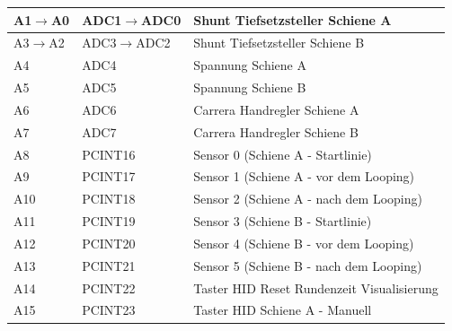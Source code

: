 \documentclass[a4paper, 11pt]{report}
\begin{document}
\begin{table}[hb]
\begin{tabular}{|l|l|l|}
			\hline
			A1$\rightarrow$A0 & ADC1$\rightarrow$ADC0 & Shunt Tiefsetzsteller Schiene A\\
			\hline
			A3$\rightarrow$A2 & ADC3$\rightarrow$ADC2 & Shunt Tiefsetzsteller Schiene B\\
			\hline
			A4 & ADC4 & Spannung Schiene A\\
			\hline
			A5 & ADC5 & Spannung Schiene B\\
			\hline
			A6 & ADC6 & Carrera Handregler Schiene A\\
			\hline
			A7 & ADC7 & Carrera Handregler Schiene B\\
			\hline
			A8 & PCINT16 & Sensor 0 (Schiene A - Startlinie)\\
			\hline
			A9 & PCINT17 & Sensor 1 (Schiene A - vor dem Looping)\\
			\hline
			A10 & PCINT18 & Sensor 2 (Schiene A - nach dem Looping)\\
			\hline
			A11 & PCINT19 & Sensor 3 (Schiene B - Startlinie)\\
			\hline
			A12 & PCINT20 & Sensor 4 (Schiene B - vor dem Looping)\\
			\hline
			A13 & PCINT21 & Sensor 5 (Schiene B - nach dem Looping)\\
			\hline
			A14 & PCINT22 & Taster HID \glqq Reset Rundenzeit Visualisierung\grqq \\
			\hline
			A15 & PCINT23 & Taster HID \glqq Schiene A - Manuell\grqq \\
			\hline
		\end{tabular}
		
		\label{tab:AnhangBelegungArduino}
	\end{table}

	\clearpage
	
	
	
	
\end{document}

